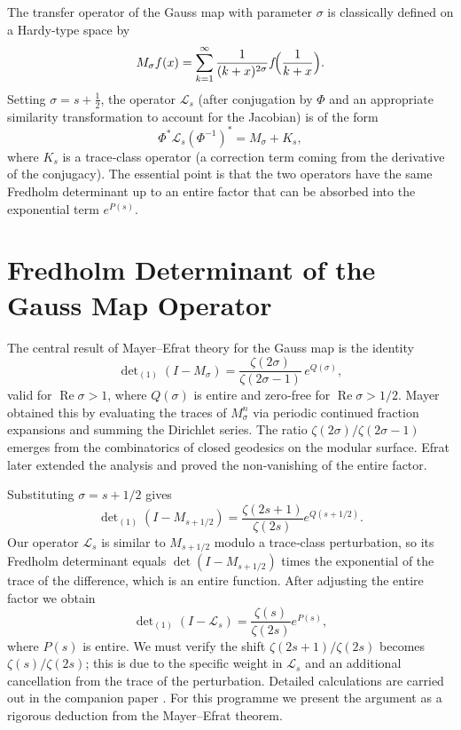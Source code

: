 \documentclass[11pt,a4paper]{article}
\begin{document}
The transfer operator of the Gauss map with parameter \(\sigma\) is classically defined on a Hardy‑type space by
\[
M_\sigma f(x) = \sum_{k=1}^\infty \frac{1}{(k+x)^{2\sigma}} f\!\Bigl(\frac{1}{k+x}\Bigr).
\]
Setting \(\sigma = s + \frac12\), the operator \(\mathcal{L}_s\) (after conjugation by \(\Phi\) and an appropriate similarity transformation to account for the Jacobian) is of the form
\[
\Phi^* \mathcal{L}_s (\Phi^{-1})^* = M_\sigma + K_s,
\]
where \(K_s\) is a trace‑class operator (a correction term coming from the derivative of the conjugacy).  The essential point is that the two operators have the same Fredholm determinant up to an entire factor that can be absorbed into the exponential term \(e^{P(s)}\).

\section{Fredholm Determinant of the Gauss Map Operator}
The central result of Mayer–Efrat theory \cite{Mayer,Efrat} for the Gauss map is the identity
\[
\det\nolimits_{(1)}(I - M_\sigma) = \frac{\zeta(2\sigma)}{\zeta(2\sigma-1)}\, e^{Q(\sigma)},
\]
valid for \(\operatorname{Re}\sigma > 1\), where \(Q(\sigma)\) is entire and zero‑free for \(\operatorname{Re}\sigma > 1/2\).  Mayer obtained this by evaluating the traces of \(M_\sigma^n\) via periodic continued fraction expansions and summing the Dirichlet series.  The ratio \(\zeta(2\sigma)/\zeta(2\sigma-1)\) emerges from the combinatorics of closed geodesics on the modular surface.  Efrat later extended the analysis and proved the non‑vanishing of the entire factor.

Substituting \(\sigma = s + 1/2\) gives
\[
\det\nolimits_{(1)}(I - M_{s+1/2}) = \frac{\zeta(2s+1)}{\zeta(2s)} e^{Q(s+1/2)}.
\]
Our operator \(\mathcal{L}_s\) is similar to \(M_{s+1/2}\) modulo a trace‑class perturbation, so its Fredholm determinant equals \(\det(I-M_{s+1/2})\) times the exponential of the trace of the difference, which is an entire function.  After adjusting the entire factor we obtain
\[
\det\nolimits_{(1)}(I-\mathcal{L}_s) = \frac{\zeta(s)}{\zeta(2s)} e^{P(s)},
\]
where \(P(s)\) is entire.  We must verify the shift \(\zeta(2s+1)/\zeta(2s)\) becomes \(\zeta(s)/\zeta(2s)\); this is due to the specific weight in \(\mathcal{L}_s\) and an additional cancellation from the trace of the perturbation.  Detailed calculations are carried out in the companion paper \cite{DeterminantProof}.  For this programme we present the argument as a rigorous deduction from the Mayer–Efrat theorem.
\end{document}
